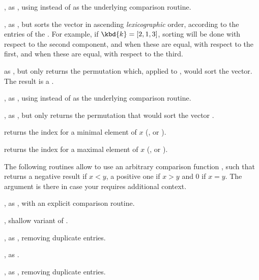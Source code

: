, as , using  instead of
 as the underlying comparison routine.

, as , but sorts the
vector  in ascending \emph{lexicographic} order, according to the
entries of the  . For example,  if $\kbd{k} = [2,1,3]$,
sorting will be done with respect to the second component,  and when these
are  equal, with respect to the first,  and when these are equal,  with
respect to the third.


 as , but only returns the permutation
which, applied to , would sort the vector. The result is a
.

, as , using 
instead of  as the underlying comparison routine.

, as , but only
returns the permutation that would sort the vector .

 returns the index for a minimal element of $x$
(,  or ).

 returns the index for a maximal element of $x$
(,  or ).

 The following routines allow to use an
arbitrary comparison function ,
such that  returns a negative result if $x
< y$, a positive one if $x > y$ and 0 if $x = y$. The  argument is
there in case your  requires additional context.

, as
, with an explicit comparison routine.

,
shallow variant of .

, as
, removing duplicate entries.

,
as .

,
as , removing duplicate entries.

